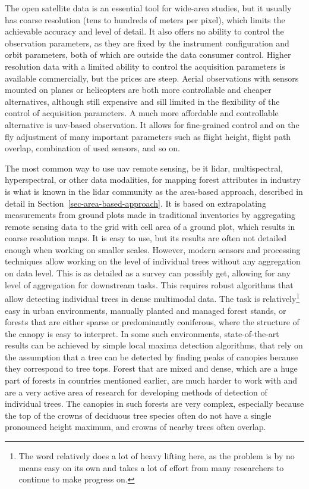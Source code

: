 The open satellite data is an essential tool for wide-area studies, but it usually has coarse resolution (tens to hundreds of meters per pixel), which limits the achievable accuracy and level of detail.
It also offers no ability to control the observation parameters, as they are fixed by the instrument configuration and orbit parameters, both of which are outside the data consumer control.
Higher resolution data with a limited ability to control the acquisition parameters is available commercially, but the prices are steep.
Aerial observations with sensors mounted on planes or helicopters are both more controllable and cheaper alternatives, although still expensive and sill limited in the flexibility of the control of acquisition parameters.
A much more affordable and controllable alternative is \gls{uav}-based observation.
It allows for fine-grained control and on the fly adjustment of many important parameters such as flight height, flight path overlap, combination of used sensors, and so on.

The most common way to use \gls{uav} remote sensing, be it \gls{lidar}, multispectral, hyperspectral, or other data modalities, for mapping forest attributes in industry is what is known in the \gls{lidar} community as the area-based approach, described in detail in Section~\ref{sec-area-based-approach}.
It is based on extrapolating measurements from ground plots made in traditional inventories by aggregating remote sensing data to the grid with cell area of a ground plot, which results in coarse resolution maps.
It is easy to use, but its results are often not detailed enough when working on smaller scales.
However, modern sensors and processing techniques allow working on the level of individual trees without any aggregation on data level.
This is as detailed as a survey can possibly get, allowing for any level of aggregation for downstream tasks.
This requires robust algorithms that allow detecting individual trees in dense multimodal data.
The task is relatively\footnote{The word relatively does a lot of heavy lifting here, as the problem is by no means easy on its own and takes a lot of effort from many researchers to continue to make progress on.
} easy in urban environments, manually planted and managed forest stands, or forests that are either sparse or predominantly coniferous, where the structure of the canopy is easy to interpret.
In some such environments, state-of-the-art results can be achieved by simple local maxima detection algorithms, that rely on the assumption that a tree can be detected by finding peaks of canopies because they correspond to tree tops.
Forest that are mixed and dense, which are a huge part of forests in countries mentioned earlier, are much harder to work with and are a very active area of research for developing methods of detection of individual trees.
The canopies in such forests are very complex, especially because the top of the crowns of deciduous tree species often do not have a single pronounced height maximum, and crowns of nearby trees often overlap.

